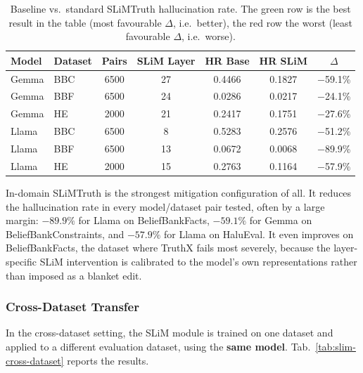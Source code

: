 \begin{table}[H]
\centering
\setlength{\tabcolsep}{4pt}
\begin{tabular}{llccccc}
\toprule
\textbf{Model} & \textbf{Dataset} & \textbf{Pairs} & \textbf{SLiM Layer} & \textbf{HR Base} & \textbf{HR SLiM} & \textbf{$\Delta$} \\
\midrule
Gemma & BBC & 6500 & 27 & 0.4466 & 0.1827 & $-$59.1\% \\
\rowcolor{red!25}Gemma & BBF & 6500 & 24 & 0.0286 & 0.0217 & $-$24.1\% \\
Gemma & HE  & 2000 & 21 & 0.2417 & 0.1751 & $-$27.6\% \\
\midrule
Llama & BBC & 6500 & 8  & 0.5283 & 0.2576 & $-$51.2\% \\
\rowcolor{green!25}Llama & BBF & 6500 & 13 & 0.0672 & 0.0068 & $-$89.9\% \\
Llama & HE  & 2000 & 15 & 0.2763 & 0.1164 & $-$57.9\% \\
\bottomrule
\end{tabular}
\caption{Baseline vs.\ standard SLiMTruth hallucination rate. The green row is the best result in the table (most favourable $\Delta$, i.e.\ better), the red row the worst (least favourable $\Delta$, i.e.\ worse).}
\label{tab:slim-baseline-standard}
\end{table}

In-domain SLiMTruth is the strongest mitigation configuration of all. It reduces the hallucination rate in every model/dataset pair tested, often by a large margin: $-89.9\%$ for Llama on BeliefBankFacts, $-59.1\%$ for Gemma on BeliefBankConstraints, and $-57.9\%$ for Llama on HaluEval. It even improves on BeliefBankFacts, the dataset where TruthX fails most severely, because the layer-specific SLiM intervention is calibrated to the model's own representations rather than imposed as a blanket edit.

\subsubsection{Cross-Dataset Transfer}

In the cross-dataset setting, the SLiM module is trained on one dataset and applied to a different evaluation dataset, using the \textbf{same model}. Tab.~\ref{tab:slim-cross-dataset} reports the results.

